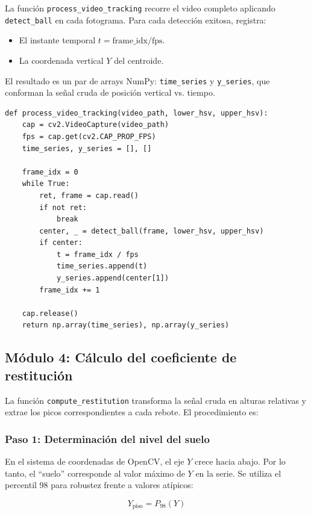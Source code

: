 \documentclass[12pt,a4paper]{article}
\begin{document}
La función \texttt{process\_video\_tracking} recorre el video completo aplicando \texttt{detect\_ball} en cada fotograma. Para cada detección exitosa, registra:

\begin{itemize}
    \item El instante temporal $t = \text{frame\_idx} / \text{fps}$.
    \item La coordenada vertical $Y$ del centroide.
\end{itemize}

El resultado es un par de arrays NumPy: \texttt{time\_series} y \texttt{y\_series}, que conforman la señal cruda de posición vertical vs. tiempo.

\begin{lstlisting}[caption={Extracción de la serie temporal $Y(t)$.}]
def process_video_tracking(video_path, lower_hsv, upper_hsv):
    cap = cv2.VideoCapture(video_path)
    fps = cap.get(cv2.CAP_PROP_FPS)
    time_series, y_series = [], []

    frame_idx = 0
    while True:
        ret, frame = cap.read()
        if not ret:
            break
        center, _ = detect_ball(frame, lower_hsv, upper_hsv)
        if center:
            t = frame_idx / fps
            time_series.append(t)
            y_series.append(center[1])
        frame_idx += 1

    cap.release()
    return np.array(time_series), np.array(y_series)
\end{lstlisting}

\subsection{Módulo 4: Cálculo del coeficiente de restitución}

La función \texttt{compute\_restitution} transforma la señal cruda en alturas relativas y extrae los picos correspondientes a cada rebote. El procedimiento es:

\subsubsection{Paso 1: Determinación del nivel del suelo}

En el sistema de coordenadas de OpenCV, el eje $Y$ crece hacia abajo. Por lo tanto, el ``suelo'' corresponde al valor máximo de $Y$ en la serie. Se utiliza el percentil 98 para robustez frente a valores atípicos:

\begin{equation}
    Y_{\text{piso}} = P_{98}(Y)
\end{equation}
\end{document}
